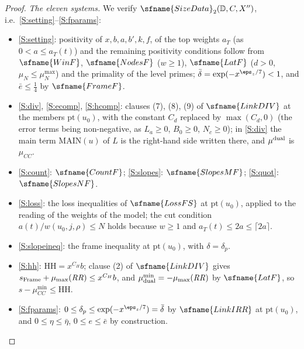 \begin{proof}
\emph{The eleven systems.} We verify $\sfname{SizeData}_2(\mathbb D,C,X'')$, i.e.\ \ref{S:setting}--\ref{S:fparams}:
\begin{itemize}
\item \ref{S:setting}: positivity of $x,b,a,b',k,f$, of the top weights $a_T$ (as $0<a\le a_T(t)$) and the remaining
positivity conditions follow from
$\sfname{WinF}$, $\sfname{NodesF}$ ($w\ge1$), $\sfname{LatF}$ ($d>0$, $\mu_N\le\mu_N^{\max}$) and the primality of the
level primes; $\bar\delta=\exp(-x^{\eps_z/7})<1$, and $\bar e\le\frac14$ by $\sfname{FrameF}$.
\item \ref{S:div}, \ref{S:ecomp}, \ref{S:hcomp}: clauses (7), (8), (9) of $\sfname{LinkDIV}$ at the members
$\mathrm{pt}(u_0)$, with the constant $C_d$ replaced by $\max(C_d,0)$ (the error terms being non-negative, as $L_a\ge0$,
$B_0\ge0$, $N_c\ge0$); in \ref{S:div} the main term $\mathrm{MAIN}(u)$ of $L$ is the right-hand side written there, and
$\mu^{\rm dual}$ is $\mu_{CC}$.
\item \ref{S:count}: $\sfname{CountF}$; \ref{S:slopes}: $\sfname{SlopesMF}$; \ref{S:quot}: $\sfname{SlopesNF}$.
\item \ref{S:loss}: the loss inequalities of $\sfname{LossFS}$ at $\mathrm{pt}(u_0)$, applied to the reading of the weights
of the model; the cut condition $a(t)/w(u_0,j,\rho)\le N$ holds because $w\ge1$ and $a_T(t)\le2a\le\lceil2a\rceil$.
\item \ref{S:slopeineq}: the frame inequality at $\mathrm{pt}(u_0)$, with $\delta=\delta_p$.
\item \ref{S:hh}: $\mathrm{HH}=x^{C_H}b$; clause (2) of $\sfname{LinkDIV}$ gives $s_{\rm Frame}+\mu_{\max}(\mathit{RR})\le
x^{C_H}b$, and $\mu^{\min}_{\rm dual}=-\mu_{\max}(\mathit{RR})$ by $\sfname{LatF}$, so $s-\mu^{\min}_{CC}\le\mathrm{HH}$.
\item \ref{S:fparams}: $0\le\delta_p\le\exp(-x^{\eps_z/7})=\bar\delta$ by $\sfname{LinkIRR}$ at $\mathrm{pt}(u_0)$, and
$0\le\eta\le\bar\eta$, $0\le e\le\bar e$ by construction.
\end{itemize}


\end{proof}
